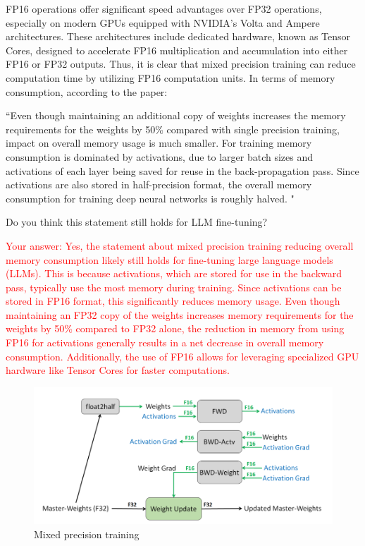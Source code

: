 FP16 operations offer significant speed advantages over FP32 operations, especially on modern GPUs equipped with NVIDIA's Volta and Ampere architectures. These architectures include dedicated hardware, known as Tensor Cores, designed to accelerate FP16 multiplication and accumulation into either FP16 or FP32 outputs. Thus, it is clear that mixed precision training can reduce computation time by utilizing FP16 computation units. In terms of memory consumption, according to the paper:

``Even though maintaining an additional copy of weights increases the memory requirements for the weights by 50\% compared with single precision training, impact on overall memory usage is much smaller. For training memory consumption is dominated by activations, due to larger batch sizes and activations of each layer being saved for reuse in the back-propagation pass. Since activations are also stored in half-precision format, the overall memory consumption for training deep neural networks is roughly halved. "

Do you think this statement still holds for LLM fine-tuning?

\textcolor{red}{
Your answer: Yes, the statement about mixed precision training reducing overall memory consumption likely still holds for fine-tuning large language models (LLMs). This is because activations, which are stored for use in the backward pass, typically use the most memory during training. Since activations can be stored in FP16 format, this significantly reduces memory usage. Even though maintaining an FP32 copy of the weights increases memory requirements for the weights by 50\% compared to FP32 alone, the reduction in memory from using FP16 for activations generally results in a net decrease in overall memory consumption. Additionally, the use of FP16 allows for leveraging specialized GPU hardware like Tensor Cores for faster computations.
}

\begin{figure}[h]
    \centering
    \includegraphics[width=\textwidth]{figures/amp.png}
    \caption{Mixed precision training}
    \label{fig:amp}
\end{figure}
